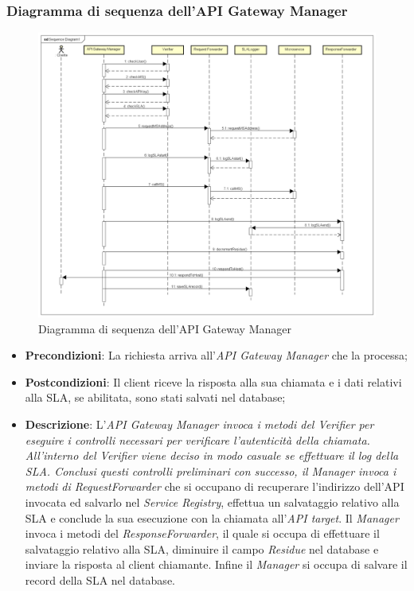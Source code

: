 \newpage
\subsubsection{Diagramma di sequenza dell'API Gateway Manager}
\begin{figure}[h]
	\centering
	\includegraphics[width=1.0\linewidth]{"IMG/Sequence Diagram1"}
	\caption{Diagramma di sequenza dell'API Gateway Manager}
\end{figure}


\begin{itemize}
	\item \textbf{Precondizioni}: La richiesta arriva all'\textit{API Gateway Manager} che la processa;
	\item \textbf{Postcondizioni}: Il client riceve la risposta alla sua chiamata e i dati relativi alla SLA, se abilitata, sono stati salvati nel database;
	\item \textbf{Descrizione}: L'\textit{API Gateway Manager invoca i metodi del \textit{Verifier} per eseguire i controlli necessari per verificare l'autenticità della chiamata. All'interno del \textit{Verifier} viene deciso in modo casuale se effettuare il log della SLA.
	Conclusi questi controlli preliminari con successo, il \textit{Manager} invoca i metodi di \textit{}RequestForwarder} che si occupano di recuperare l'indirizzo dell'API invocata ed salvarlo nel \textit{Service Registry}, effettua un salvataggio relativo alla SLA e conclude la sua esecuzione con la chiamata all'\textit{API target}. Il \textit{Manager} invoca i metodi del \textit{ResponseForwarder}, il quale si occupa di effettuare il salvataggio relativo alla SLA, diminuire il campo \textit{Residue} nel database e inviare la risposta al client chiamante. Infine il \textit{Manager} si occupa di salvare il record della SLA nel database.  
\end{itemize}
